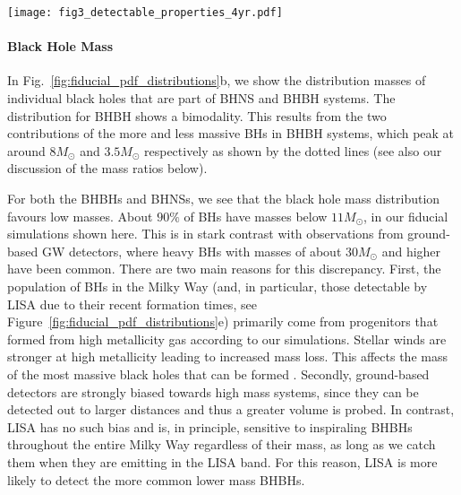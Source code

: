 \begin{figure*}[t]
    \centering
    \texttt{[image: fig3\_detectable\_properties\_4yr.pdf]}
    \caption{Properties of detectable systems for a 4-year LISA mission in our fiducial model. Each panel shows a kernel density estimator for a single property, coloured by DCO type. The shaded areas show the 1- and 2-$\sigma$ uncertainties (obtained via bootstrapping). The dotted lines in panel b show the individual primary and secondary mass distributions. The dotted line in panel e shows the star formation history we have assumed in our Milky Way model. See Sec.~\ref{sec:fiducial_distributions} for a discussion. \href{https://github.com/TomWagg/detecting-DCOs-in-LISA/blob/main/paper/figures/fig3_detectable_properties_4yr.pdf}{\faFileImage} \href{https://github.com/TomWagg/detecting-DCOs-in-LISA/blob/main/paper/figure_notebooks/fiducial.ipynb}{\faBook}.}
    \label{fig:fiducial_pdf_distributions}
\end{figure*}

\paragraph{Black Hole Mass}
In Fig.~\ref{fig:fiducial_pdf_distributions}b, we show the distribution masses of individual black holes that are part of BHNS and BHBH systems. 
The distribution for BHBH shows a bimodality. This results from the two contributions of the more and less massive BHs in BHBH systems, which peak at around $8 \unit{M_{\odot}}$ and $3.5 \unit{M_{\odot}}$ respectively as shown by the dotted lines (see also our discussion of the mass ratios below).

For both the BHBHs and BHNSs, we see that the black hole mass distribution favours low masses. About $90\%$ of BHs have masses below $11 \unit{M_{\odot}}$, in our fiducial simulations shown here. This is in stark contrast with observations from ground-based GW detectors, where heavy BHs with masses of about $30\unit{M_{\odot}}$ and higher have been common. There are two main reasons for this discrepancy. First, the population of BHs in the Milky Way (and, in particular, those detectable by LISA due to their recent formation times, see Figure~\ref{fig:fiducial_pdf_distributions}e) primarily come from progenitors that formed from high metallicity gas according to our simulations. Stellar winds are stronger at high metallicity leading to increased mass loss. This affects the mass of the most massive black holes that can be formed \citep{Belczynski+2010}. Secondly, ground-based detectors are strongly biased towards high mass systems, since they can be detected out to larger distances and thus a greater volume is probed. In contrast, LISA has no such bias and is, in principle, sensitive to inspiraling BHBHs throughout the entire Milky Way regardless of their mass, as long as we catch them when they are emitting in the LISA band. For this reason, LISA is more likely to detect the more common lower mass BHBHs. 

